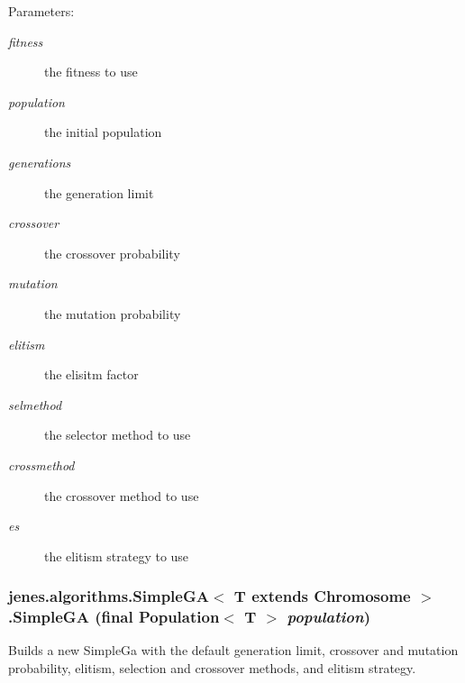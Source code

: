 \begin{Desc}
\item[Parameters:]
\begin{description}
\item[{\em fitness}]the fitness to use \item[{\em population}]the initial population \item[{\em generations}]the generation limit \item[{\em crossover}]the crossover probability \item[{\em mutation}]the mutation probability \item[{\em elitism}]the elisitm factor \item[{\em selmethod}]the selector method to use \item[{\em crossmethod}]the crossover method to use \item[{\em es}]the elitism strategy to use \end{description}
\end{Desc}
\hypertarget{classjenes_1_1algorithms_1_1_simple_g_a_3_01_t_01extends_01_chromosome_01_4_3f8162d093934286fd3963580f380d9a}{
\subsubsection[SimpleGA]{\setlength{\rightskip}{0pt plus 5cm}jenes.algorithms.SimpleGA$<$ T extends Chromosome $>$.SimpleGA (final Population$<$ T $>$ {\em population})}}
\label{classjenes_1_1algorithms_1_1_simple_g_a_3_01_t_01extends_01_chromosome_01_4_3f8162d093934286fd3963580f380d9a}


Builds a new SimpleGa with the default generation limit, crossover and mutation probability, elitism, selection and crossover methods, and elitism strategy. 

